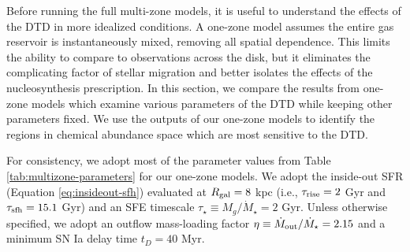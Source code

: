 \documentclass[twocolumn,twocolappendix,linenumbers]{aastex631}
\begin{document}

Before running the full multi-zone models, it is useful to understand the effects of the DTD in more idealized conditions. A one-zone model assumes the entire gas reservoir is instantaneously mixed, removing all spatial dependence. This limits the ability to compare to observations across the disk, but it eliminates the complicating factor of stellar migration and better isolates the effects of the nucleosynthesis prescription. In this section, we compare the results from one-zone models which examine various parameters of the DTD while keeping other parameters fixed. We use the outputs of our one-zone models to identify the regions in chemical abundance space which are most sensitive to the DTD.

For consistency, we adopt most of the parameter values from Table \ref{tab:multizone-parameters} for our one-zone models.
We adopt the inside-out SFR (Equation \ref{eq:insideout-sfh}) evaluated at $R_{\rm gal}=8$ kpc (i.e., $\tau_{\rm rise}=2$ Gyr and $\tau_{\rm sfh}=15.1$ Gyr) and an SFE timescale $\tau_\star\equiv M_g/\dot M_\star=2$ Gyr. Unless otherwise specified, we adopt an outflow mass-loading factor $\eta\equiv \dot M_{\rm out}/\dot M_\star=2.15$  and a minimum SN Ia delay time $t_D=40$ Myr. 
\end{document}
